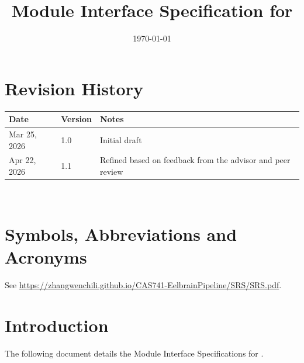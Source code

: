 \documentclass[12pt, titlepage]{article}
\begin{document}
\title{Module Interface Specification for \progname{}}

\author{\authname}

\date{\today}

\maketitle









\section{Revision History}


\begin{tabularx}{\textwidth}{p{3cm}p{2cm}X}
\toprule {\bf Date} & {\bf Version} & {\bf Notes}\\
\midrule
    Mar 25, 2026 & 1.0 & Initial draft\\
    Apr 22, 2026 & 1.1 & Refined based on feedback from the advisor and peer review \\
\bottomrule
\end{tabularx}


~\newpage








\section{Symbols, Abbreviations and Acronyms}


See \url{https://zhangwenchili.github.io/CAS741-EelbrainPipeline/SRS/SRS.pdf}.


\newpage


\tableofcontents


\newpage










\section{Introduction}


The following document details the Module Interface Specifications for \progname{}.
\end{document}
